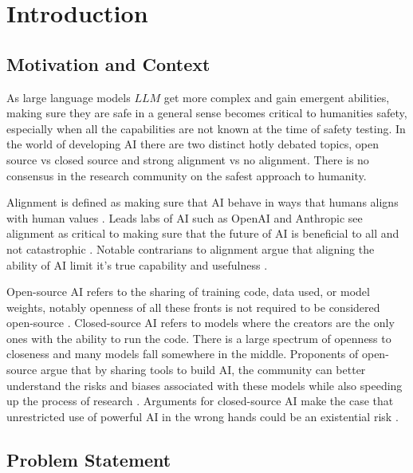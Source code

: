 \section{Introduction}

\subsection{Motivation and Context}

As large language models \(LLM\) get more complex and gain emergent abilities, making sure they are safe in a general sense becomes critical to humanities safety, especially when all the capabilities are not known at the time of safety testing. In the world of developing AI there are two distinct hotly debated topics, open source vs closed source and strong alignment vs no alignment. There is no consensus in the research community on the safest approach to humanity.

Alignment is defined as making sure that AI behave in ways that humans aligns with human values \citep{ji_ai_nodate}. Leads labs of AI such as OpenAI and Anthropic see alignment as critical to making sure that the future of AI is beneficial to all and not catastrophic \citep{openai_alignment, anthropic_core_views}. Notable contrarians to alignment argue that aligning the ability of AI limit it's true capability and usefulness \citep{franzen_2024_interview}.

Open-source AI refers to the sharing of training code, data used, or model weights, notably openness of all these fronts is not required to be considered open-source \citep{eiras_near_2024}. Closed-source AI refers to models where the creators are the only ones with the ability to run the code. There is a large spectrum of openness to closeness and many models fall somewhere in the middle. Proponents of open-source argue that by sharing tools to build AI, the community can better understand the risks and biases associated with these models while also speeding up the process of research \citep{groeneveld_olmo_2024}. Arguments for closed-source AI make the case that unrestricted use of powerful AI in the wrong hands could be an existential risk \citep{deepmind_frontier_2025}.

\subsection{Problem Statement}

